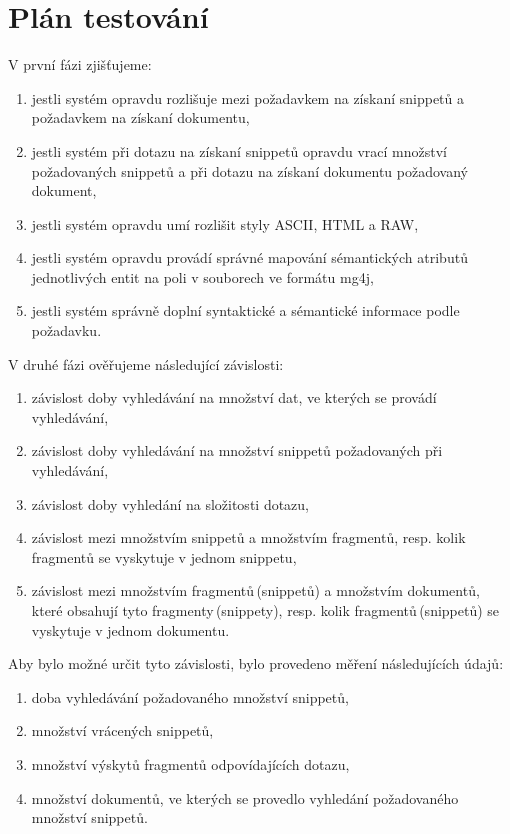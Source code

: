 \section{Plán testování}
\label{testPlan}
V první fázi zjišťujeme:
\begin{enumerate}
\item jestli systém opravdu rozlišuje mezi požadavkem na získaní snippetů a požadavkem na získaní dokumentu,

\item jestli systém při dotazu na získaní snippetů opravdu vrací množství požadovaných snippetů a při dotazu na získaní dokumentu požadovaný dokument,

\item jestli systém opravdu umí rozlišit styly ASCII, HTML a RAW,

\item jestli systém opravdu provádí správné mapování sémantických atributů jednotlivých entit na poli v souborech ve formátu mg4j,

\item jestli systém správně doplní syntaktické a sémantické informace podle požadavku.
\end{enumerate}
V druhé fázi ověřujeme následující závislosti:

\begin{enumerate}
\item závislost doby vyhledávání na množství dat, ve kterých se provádí vyhledávání,

\item závislost doby vyhledávání na množství snippetů požadovaných při vyhledávání,

\item závislost doby vyhledání na složitosti dotazu,

\item závislost mezi množstvím snippetů a množstvím fragmentů, resp. kolik fragmentů se vyskytuje v jednom snippetu,

\item závislost mezi množstvím  fragmentů\,(snippetů) a množstvím dokumentů, které obsahují tyto fragmenty\,(snippety), resp. kolik fragmentů\,(snippetů) se vyskytuje v jednom dokumentu.
\end{enumerate}
Aby bylo možné určit tyto závislosti, bylo provedeno měření následujících údajů:
\begin{enumerate}
\item doba vyhledávání požadovaného množství snippetů,
\item množství vrácených snippetů,
\item množství výskytů fragmentů odpovídajících dotazu,
\item množství dokumentů, ve kterých se provedlo vyhledání požadovaného množství snippetů.
\end{enumerate}

